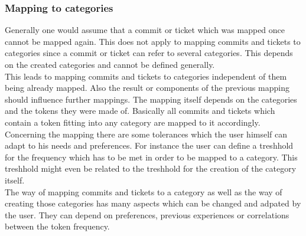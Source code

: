 \subsubsection{Mapping to categories}

Generally one would assume that a commit or ticket which was mapped once cannot be mapped again. This does not apply to mapping commits and tickets to categories since a commit or ticket can refer to several categories. This depends on the created categories and cannot be defined generally.\\
This leads to mapping commits and tickets to categories independent of them being already mapped. Also the result or components of the previous mapping should influence further mappings. The mapping itself depends on the categories and the tokens they were made of. Basically all commits and tickets which contain a token fitting into any category are mapped to it accordingly. \\
Concerning the mapping there are some tolerances which the user himself can adapt to his needs and preferences. For instance the user can define a treshhold for the frequency which has to be met in order to be mapped to a category. This treshhold might even be related to the treshhold for the creation of the category itself. \\
The way of mapping commits and tickets to a category as well as the way of creating those categories has many aspects which can be changed and adpated by the user. They can depend on preferences, previous experiences or correlations between the token frequency.




